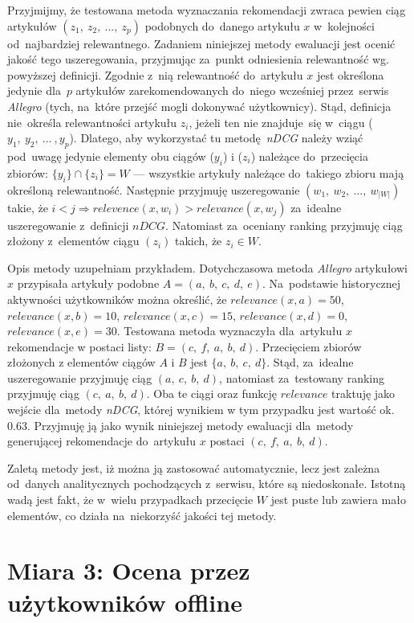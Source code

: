 \documentclass[pl]{minipw} %
\begin{document}
Przyjmijmy, że testowana metoda wyznaczania rekomendacji zwraca pewien ciąg artykułów $(z_1,\ z_2,\ ...,\ z_p)$ podobnych do~danego artykułu $x$ w~kolejności od~najbardziej relewantnego. Zadaniem niniejszej metody ewaluacji jest ocenić jakość tego uszeregowania, przyjmując za~punkt odniesienia relewantność wg. powyższej definicji. Zgodnie z~nią relewantność do~artykułu $x$ jest określona jedynie dla~$p$ artykułów zarekomendowanych do~niego wcześniej przez~serwis \textit{Allegro} (tych, na~które przejść mogli dokonywać użytkownicy). Stąd, definicja nie~określa relewantności artykułu $z_i$, jeżeli ten nie znajduje~się w~ciągu ($y_1,\ y_2,\ ...\ ,y_p$). Dlatego, aby wykorzystać tu metodę \textit{nDCG} należy wziąć pod~uwagę jedynie elementy obu ciągów ($y_i$) i ($z_i$) należące do~przecięcia zbiorów: $\{y_i\} \cap \{z_i\} = W$ --- wszystkie artykuły należące do~takiego zbioru mają określoną relewantność. Następnie przyjmuję uszeregowanie $(w_1,\ w_2,\ ...,\ w_{|W|})$ takie, że $i<j \Rightarrow relevence(x,w_i) > relevance(x,w_j)$ za~idealne uszeregowanie z~definicji $nDCG$. Natomiast za~oceniany ranking przyjmuję ciąg złożony z~elementów ciągu $(z_i)$ takich, że $z_i \in W$.


Opis metody uzupełniam przykładem. Dotychczasowa metoda \textit{Allegro} artykułowi $x$ przypisała artykuły podobne $A = (a,\ b,\ c,\ d,\ e)$. Na~podstawie historycznej aktywności użytkowników można określić, że $relevance(x, a)=50$, $relevance(x, b)=10$, $relevance(x, c)=15$, $relevance(x, d)=0$, $relevance(x, e)=30$. Testowana metoda wyznaczyła dla~artykułu $x$ rekomendacje w postaci listy: $B=(c,\ f,\ a,\ b,\ d)$. Przecięciem zbiorów złożonych z elementów ciągów $A$ i $B$ jest $\{a,\ b,\ c,\ d\}$. Stąd, za~idealne uszeregowanie przyjmuję ciąg $(a,\ c,\ b,\ d)$, natomiast za~testowany ranking przyjmuję ciąg $(c,\ a,\ b,\ d)$. Oba te ciągi oraz funkcję $relevance$ traktuję jako wejście dla~metody \textit{nDCG}, której wynikiem w tym przypadku jest wartość ok. $0.63$. Przyjmuję ją jako wynik niniejszej metody ewaluacji dla~metody generującej rekomendacje do~artykułu $x$ postaci $(c,\ f,\ a,\ b,\ d)$.
 
 
Zaletą metody jest, iż można ją zastosować automatycznie, lecz jest zależna od~danych analitycznych pochodzących z~serwisu, które są niedoskonałe. Istotną wadą jest fakt, że w~wielu przypadkach przecięcie $W$ jest puste lub zawiera mało elementów, co działa na~niekorzyść jakości tej metody.

\section{Miara 3: Ocena przez użytkowników offline}
\end{document}
